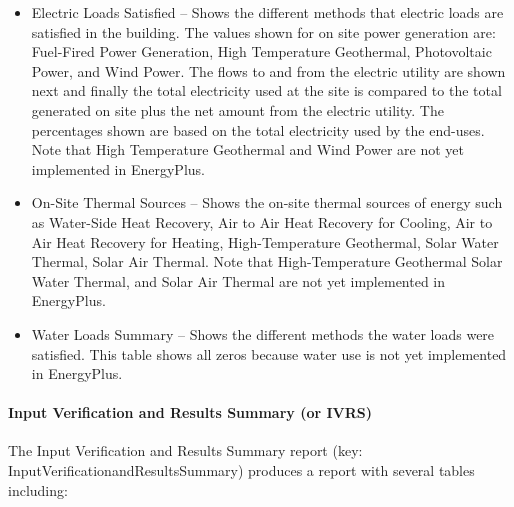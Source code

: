 \begin{itemize}
\item
  Electric Loads Satisfied -- Shows the different methods that electric loads are satisfied in the building. The values shown for on site power generation are: Fuel-Fired Power Generation, High Temperature Geothermal, Photovoltaic Power, and Wind Power. The flows to and from the electric utility are shown next and finally the total electricity used at the site is compared to the total generated on site plus the net amount from the electric utility. The percentages shown are based on the total electricity used by the end-uses. Note that High Temperature Geothermal and Wind Power are not yet implemented in EnergyPlus.
\item
  On-Site Thermal Sources -- Shows the on-site thermal sources of energy such as Water-Side Heat Recovery, Air to Air Heat Recovery for Cooling, Air to Air Heat Recovery for Heating, High-Temperature Geothermal, Solar Water Thermal, Solar Air Thermal. Note that High-Temperature Geothermal Solar Water Thermal, and Solar Air Thermal are not yet implemented in EnergyPlus.
\item
  Water Loads Summary -- Shows the different methods the water loads were satisfied. This table shows all zeros because water use is not yet implemented in EnergyPlus.
\end{itemize}

\paragraph{Input Verification and Results Summary (or IVRS)}\label{input-verification-and-results-summary-or-ivrs}

The Input Verification and Results Summary report (key: InputVerificationandResultsSummary) produces a report with several tables including:

